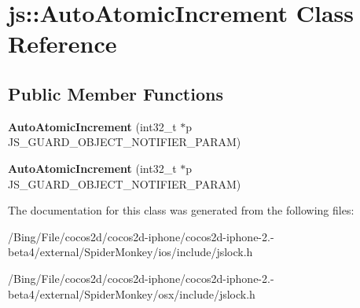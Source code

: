 \hypertarget{classjs_1_1_auto_atomic_increment}{\section{js\-:\-:Auto\-Atomic\-Increment Class Reference}
\label{classjs_1_1_auto_atomic_increment}
}
\subsection*{Public Member Functions}
\begin{DoxyCompactItemize}
\item 
\hypertarget{classjs_1_1_auto_atomic_increment_ae3c42d5ed53b78539f0354f695b2f0c7}{{\bfseries Auto\-Atomic\-Increment} (int32\-\_\-t $\ast$p J\-S\-\_\-\-G\-U\-A\-R\-D\-\_\-\-O\-B\-J\-E\-C\-T\-\_\-\-N\-O\-T\-I\-F\-I\-E\-R\-\_\-\-P\-A\-R\-A\-M)}\label{classjs_1_1_auto_atomic_increment_ae3c42d5ed53b78539f0354f695b2f0c7}

\item 
\hypertarget{classjs_1_1_auto_atomic_increment_ae3c42d5ed53b78539f0354f695b2f0c7}{{\bfseries Auto\-Atomic\-Increment} (int32\-\_\-t $\ast$p J\-S\-\_\-\-G\-U\-A\-R\-D\-\_\-\-O\-B\-J\-E\-C\-T\-\_\-\-N\-O\-T\-I\-F\-I\-E\-R\-\_\-\-P\-A\-R\-A\-M)}\label{classjs_1_1_auto_atomic_increment_ae3c42d5ed53b78539f0354f695b2f0c7}

\end{DoxyCompactItemize}


The documentation for this class was generated from the following files\-:\begin{DoxyCompactItemize}
\item 
/\-Bing/\-File/cocos2d/cocos2d-\/iphone/cocos2d-\/iphone-\/2.-\/beta4/external/\-Spider\-Monkey/ios/include/jslock.\-h\item 
/\-Bing/\-File/cocos2d/cocos2d-\/iphone/cocos2d-\/iphone-\/2.-\/beta4/external/\-Spider\-Monkey/osx/include/jslock.\-h\end{DoxyCompactItemize}
